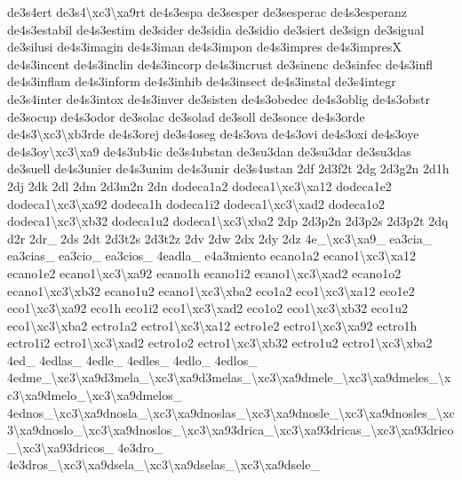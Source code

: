 \begin{DoxyCompactItemize}
de3s4ert de3s4\textbackslash{}xc3\textbackslash{}xa9rt de4s3espa de3sesper de3sesperac de4s3esperanz de4s3estabil de4s3estim de3sider de3sidia de3sidio de3siert de3sign de3sigual de3silusi de4s3imagin de4s3iman de4s3impon de4s3impres de4s3impres\-X de4s3incent de4s3inclin de4s3incorp de4s3incrust de3sinenc de3sinfec de4s3infl de4s3inflam de4s3inform de4s3inhib de4s3insect de4s3instal de3s4integr de3s4inter de4s3intox de4s3inver de3sisten de4s3obedec de4s3oblig de4s3obstr de3socup de4s3odor de3solac de3solad de3soll de3sonce de4s3orde de4s3\textbackslash{}xc3\textbackslash{}xb3rde de4s3orej de3s4oseg de4s3ova de4s3ovi de4s3oxi de4s3oye de4s3oy\textbackslash{}xc3\textbackslash{}xa9 de4s3ub4ic de3s4ubstan de3su3dan de3su3dar de3su3das de3suell de4s3unier de4s3unim de4s3unir de3s4ustan 2df 2d3f2t 2dg 2d3g2n 2d1h 2dj 2dk 2dl 2dm 2d3m2n 2dn dodeca1a2 dodeca1\textbackslash{}xc3\textbackslash{}xa12 dodeca1e2 dodeca1\textbackslash{}xc3\textbackslash{}xa92 dodeca1h dodeca1i2 dodeca1\textbackslash{}xc3\textbackslash{}xad2 dodeca1o2 dodeca1\textbackslash{}xc3\textbackslash{}xb32 dodeca1u2 dodeca1\textbackslash{}xc3\textbackslash{}xba2 2dp 2d3p2n 2d3p2s 2d3p2t 2dq d2r 2dr\-\_\- 2ds 2dt 2d3t2s 2d3t2z 2dv 2dw 2dx 2dy 2dz 4e\-\_\textbackslash{}xc3\textbackslash{}xa9\-\_\- ea3cia\-\_\- ea3cias\-\_\- ea3cio\-\_\- ea3cios\-\_\- 4eadla\-\_\- e4a3miento ecano1a2 ecano1\textbackslash{}xc3\textbackslash{}xa12 ecano1e2 ecano1\textbackslash{}xc3\textbackslash{}xa92 ecano1h ecano1i2 ecano1\textbackslash{}xc3\textbackslash{}xad2 ecano1o2 ecano1\textbackslash{}xc3\textbackslash{}xb32 ecano1u2 ecano1\textbackslash{}xc3\textbackslash{}xba2 eco1a2 eco1\textbackslash{}xc3\textbackslash{}xa12 eco1e2 eco1\textbackslash{}xc3\textbackslash{}xa92 eco1h eco1i2 eco1\textbackslash{}xc3\textbackslash{}xad2 eco1o2 eco1\textbackslash{}xc3\textbackslash{}xb32 eco1u2 eco1\textbackslash{}xc3\textbackslash{}xba2 ectro1a2 ectro1\textbackslash{}xc3\textbackslash{}xa12 ectro1e2 ectro1\textbackslash{}xc3\textbackslash{}xa92 ectro1h ectro1i2 ectro1\textbackslash{}xc3\textbackslash{}xad2 ectro1o2 ectro1\textbackslash{}xc3\textbackslash{}xb32 ectro1u2 ectro1\textbackslash{}xc3\textbackslash{}xba2 4ed\-\_\- 4edlas\-\_\- 4edle\-\_\- 4edles\-\_\- 4edlo\-\_\- 4edlos\-\_\- 4edme\-\_\textbackslash{}xc3\textbackslash{}xa9d3mela\-\_\textbackslash{}xc3\textbackslash{}xa9d3melas\-\_\textbackslash{}xc3\textbackslash{}xa9dmele\-\_\textbackslash{}xc3\textbackslash{}xa9dmeles\-\_\textbackslash{}xc3\textbackslash{}xa9dmelo\-\_\textbackslash{}xc3\textbackslash{}xa9dmelos\-\_\- 4ednos\-\_\textbackslash{}xc3\textbackslash{}xa9dnosla\-\_\textbackslash{}xc3\textbackslash{}xa9dnoslas\-\_\textbackslash{}xc3\textbackslash{}xa9dnosle\-\_\textbackslash{}xc3\textbackslash{}xa9dnosles\-\_\textbackslash{}xc3\textbackslash{}xa9dnoslo\-\_\textbackslash{}xc3\textbackslash{}xa9dnoslos\-\_\textbackslash{}xc3\textbackslash{}xa93drica\-\_\textbackslash{}xc3\textbackslash{}xa93dricas\-\_\textbackslash{}xc3\textbackslash{}xa93drico\-\_\textbackslash{}xc3\textbackslash{}xa93dricos\-\_\- 4e3dro\-\_\- 4e3dros\-\_\textbackslash{}xc3\textbackslash{}xa9dsela\-\_\textbackslash{}xc3\textbackslash{}xa9dselas\-\_\textbackslash{}xc3\textbackslash{}xa9dsele\-\_\- 
\end{DoxyCompactItemize}
